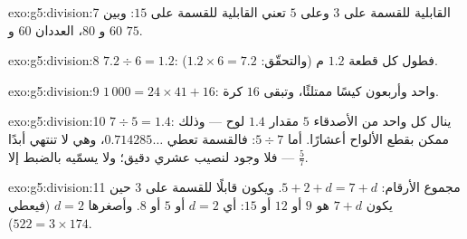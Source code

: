 \begin{solution}{exo:g5:division:7}
القابلية للقسمة على $3$ وعلى $5$ تعني القابلية للقسمة على $15$: وبين $60$ و
$80$، العددان $60$ و $75$.
\end{solution}

\begin{solution}{exo:g5:division:8}
$7.2 \div 6 = 1.2$: فطول كل قطعة $1.2$ م (والتحقّق:
$1.2 \times 6 = 7.2$).
\end{solution}

\begin{solution}{exo:g5:division:9}
$1\,000 = 24 \times 41 + 16$: واحد وأربعون كيسًا ممتلئًا، وتبقى $16$
كرة.
\end{solution}

\begin{solution}{exo:g5:division:10}
$7 \div 5 = 1.4$: ينال كل واحد من الأصدقاء $5$ مقدار $1.4$ لوح ---
وذلك ممكن بقطع الألواح أعشارًا. أما $5 \div 7$: فالقسمة
تعطي $0.714285\dots$، وهي لا تنتهي أبدًا --- فلا وجود لنصيب عشري
دقيق؛ ولا يسمّيه بالضبط إلا  $\frac57$.
\end{solution}

\begin{solution}{exo:g5:division:11}
مجموع الأرقام: $5 + 2 + d = 7 + d$. ويكون قابلًا للقسمة على $3$ حين يكون $7 + d$
هو $9$ أو $12$ أو $15$: أي $d = 2$ أو $5$ أو $8$. وأصغرها $d = 2$
(فيعطي $522 = 3 \times 174$).
\end{solution}

